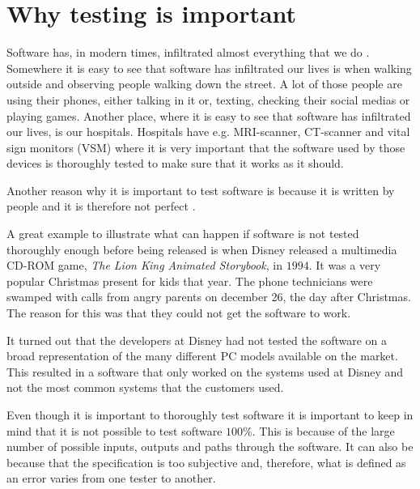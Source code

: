 \section{Why testing is important}
Software has, in modern times, infiltrated almost everything that we do \cite{SoftwareTesting}.
Somewhere it is easy to see that software has infiltrated our lives is when walking outside and observing people walking down the street.
A lot of those people are using their phones, either talking in it or, texting, checking their social medias or playing games.
Another place, where it is easy to see that software has infiltrated our lives, is our hospitals.
Hospitals have e.g. MRI-scanner, CT-scanner and vital sign monitors (VSM) where it is very important that the software used by those devices is thoroughly tested to make sure that it works as it should.

Another reason why it is important to test software is because it is written by people and it is therefore not perfect \cite{SoftwareTesting}.

A great example to illustrate what can happen if software is not tested thoroughly enough before being released is when Disney released a multimedia CD-ROM game, \textit{The Lion King Animated Storybook}, in $1994$.
It was a very popular Christmas present for kids that year.
The phone technicians were swamped with calls from angry parents on december 26, the day after Christmas.
The reason for this was that they could not get the software to work. \cite{SoftwareTesting}

It turned out that the developers at Disney had not tested the software on a broad representation of the many different PC models available on the market.
This resulted in a software that only worked on the systems used at Disney and not the most common systems that the customers used. \cite{SoftwareTesting}

Even though it is important to thoroughly test software it is important to keep in mind that it is not possible to test software $100\%$.
This is because of the large number of possible inputs, outputs and paths through the software.
It can also be because that the specification is too subjective and, therefore, what is defined as an error varies from one tester to another. \cite{SoftwareTesting}
